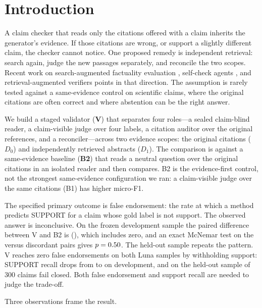 \documentclass[11pt,a4paper]{article}
\newcommand{\Dzero}{\ensuremath{D_0}}
\newcommand{\Done}{\ensuremath{D_1}}
\begin{document}
\section{Introduction}

A claim checker that reads only the citations offered with a claim
inherits the generator's evidence. If those citations are wrong, or
support a slightly different claim, the checker cannot notice. One
proposed remedy is independent retrieval: search again, judge the new
passages separately, and reconcile the two scopes. Recent work on
search-augmented factuality evaluation \citep{wei2024longform}, self-check
agents \citep{march2026,hirsch2026blame}, and retrieval-augmented
verifiers \citep{yue2024rafts,zheng2024rav} points in that direction.
The assumption is rarely tested against a same-evidence control on
scientific claims, where the original citations are often correct and
where abstention can be the right answer.

We build a staged validator (\textbf{V}) that separates four roles---a
sealed claim-blind reader, a claim-visible judge over four labels, a
citation auditor over the original references, and a reconciler---across
two evidence scopes: the original citations (\Dzero) and independently
retrieved abstracts (\Done). The comparison is against a same-evidence
baseline (\textbf{B2}) that reads a neutral question over the original
citations in an isolated reader and then compares. B2 is the
evidence-first control, not the strongest same-evidence configuration we
ran: a claim-visible judge over the same citations (B1) has higher
micro-F1.

The specified primary outcome is false endorsement: the rate at which a
method predicts SUPPORT for a claim whose gold label is not support.
The observed answer is inconclusive. On the frozen development sample the
paired difference between V and B2 is \lunadevfediff{}
(\lunadevfeci{}), which includes zero, and an exact McNemar test on the
\lunadevdiscBTwo{} versus \lunadevdiscV{} discordant pairs gives
$p=0.50{}$. The held-out sample repeats the pattern. V
reaches zero false endorsements on both Luna samples by withholding
support: SUPPORT recall drops from \lunadevBTwosupportRecall{} to
\lunadevVsupportRecall{} on development, and on the held-out sample
\lunaheldVfailclosed{} of 300 claims fail closed. Both false endorsement
and support recall are needed to judge the trade-off.

Three observations frame the result.
\end{document}
